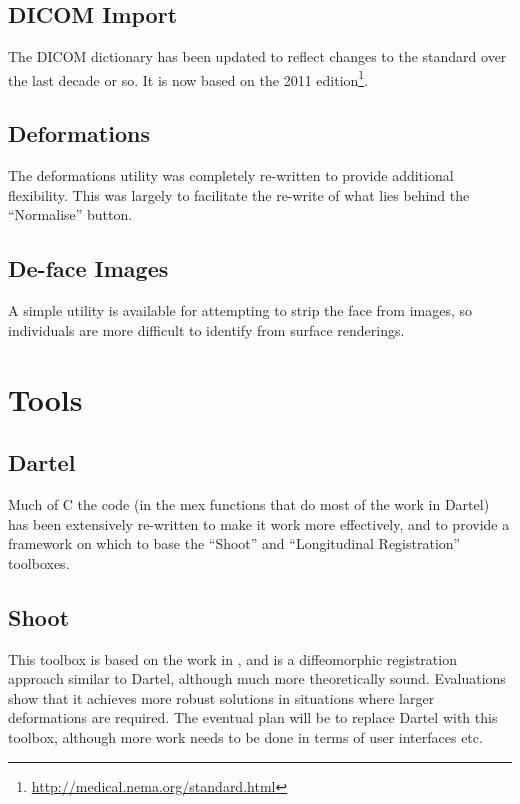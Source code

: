 \documentclass[a4paper,titlepage,openany]{article}
\begin{document}
\begin{multicols}{2}
\subsection{DICOM Import}
The DICOM dictionary has been updated to reflect changes to the standard over the last decade or so.
It is now based on the 2011 edition\footnote{\url{http://medical.nema.org/standard.html}}.

\subsection{Deformations}
The deformations utility was completely re-written to provide additional flexibility.
This was largely to facilitate the re-write of what lies behind the ``Normalise'' button.

\subsection{De-face Images}
A simple utility is available for attempting to strip the face from images, so individuals are more difficult to identify from surface renderings.

\section{Tools}

\subsection{Dartel}
Much of C the code (in the mex functions that do most of the work in Dartel) has been extensively re-written to make it work more effectively, and to provide a framework on which to base the ``Shoot'' and ``Longitudinal Registration'' toolboxes.

\subsection{Shoot}
This toolbox is based on the work in \cite{ashburner2011diffeomorphic}, and is a diffeomorphic registration approach similar to Dartel, although much more theoretically sound.
Evaluations show that it achieves more robust solutions in situations where larger deformations are required.
The eventual plan will be to replace Dartel with this toolbox, although more work needs to be done in terms of user interfaces etc.


\end{multicols}
\end{document}
